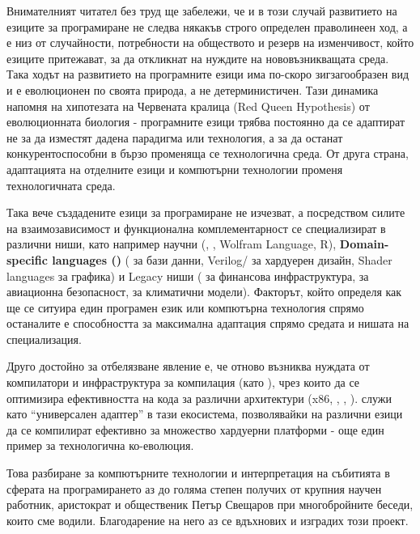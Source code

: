 Внимателният читател без труд ще забележи, че и в този случай
развитието на езиците за програмиране не следва някакъв строго определен праволинеен ход, а е низ от случайности,
потребности на обществото и резерв на изменчивост, който езиците притежават, за да откликнат на нуждите на
нововъзникващата среда. Така ходът на развитието на програмните езици има по-скоро зигзагообразен вид и
е еволюционен по своята природа, а не детерминистичен. Тази динамика напомня на хипотезата на Червената кралица (Red Queen Hypothesis) от еволюционната биология - програмните езици трябва постоянно
да се адаптират не за да изместят дадена парадигма или технология, а за да останат конкурентоспособни в бързо променяща се технологична среда. От друга страна,
адаптацията на отделните езици и компютърни технологии променя технологичната среда. 

Така вече създадените езици за програмиране не изчезват, а посредством силите на взаимозависимост и функционална комплементарност се специализират в различни ниши,
като например научни (, , Wolfram Language, R), \textbf{Domain-specific languages ()} 
( за бази данни, Verilog/ за хардуерен дизайн, Shader languages за  графика) и Legacy ниши
( за финансова инфраструктура,  за авиационна безопасност,  за климатични модели). Факторът, който
определя как ще се ситуира един програмен език или компютърна технология спрямо останалите е способността за максимална адаптация
спрямо средата и нишата на специализация.

Друго достойно за отбелязване явление е, че отново възниква
нуждата от компилатори и инфраструктура за компилация (като ), чрез които да се оптимизира ефективността на кода за различни архитектури (x86, , , ).  служи като ``универсален адаптер'' в тази екосистема, позволявайки на различни езици да се компилират ефективно за множество хардуерни платформи - още един пример за технологична ко-еволюция.

Това разбиране за компютърните технологии и интерпретация на събитията в сферата на програмирането
аз до голяма степен получих от крупния научен работник, аристократ и общественик Петър Свещаров при многобройните беседи, които сме водили.
Благодарение на него аз се вдъхнових и изградих този проект.

